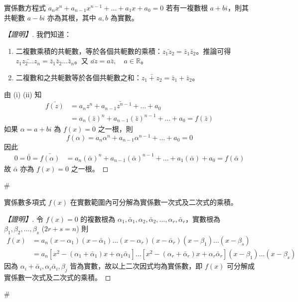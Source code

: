 \begin{theorem}[虛根共軛定理]\label{thm:b6s-2-conjugate}
實係數方程式 $a_n x^n + a_{n-1} x^{n-1} + \dots + a_1 x + a_0 = 0$ 若有一複數根 $a+bi$，則其共軛數 $a-bi$ 亦為其根，其中 $a, b$ 為實數。
\end{theorem}

\begin{proof}[【證明】]
我們知道：
\begin{enumerate}[label=(\roman*), leftmargin=2em]
  \item 二複數乘積的共軛數，等於各個共軛數的乘積：$\bar{z_1 z_2} = \bar{z}_1 \bar{z}_2$。推論可得 $\bar{z_1 z_2 \dots z_n} = \bar{z}_1 \bar{z}_2 \dots \bar{z}_n$。又 $\bar{az} = a\bar{z}, \quad a \in \mathbb{R}$。
  \item 二複數和之共軛數等於各個共軛數之和：$\bar{z_1 + z_2} = \bar{z}_1 + \bar{z}_2$。
\end{enumerate}
由 (i) (ii) 知
\begin{align*}
\bar{f(z)} &= \bar{a_n z^n + a_{n-1} z^{n-1} + \dots + a_0} \\
&= a_n (\bar{z})^n + a_{n-1} (\bar{z})^{n-1} + \dots + a_0 = f(\bar{z})
\end{align*}
如果 $\alpha = a+bi$ 為 $f(x)=0$ 之一根，則
\[ f(\alpha) = a_n \alpha^n + a_{n-1} \alpha^{n-1} + \dots + a_0 = 0 \]
因此
\begin{align*}
0 = \bar{0} = \bar{f(\alpha)} &= a_n (\bar{\alpha})^n + a_{n-1} (\bar{\alpha})^{n-1} + \dots + a_1 (\bar{\alpha}) + a_0 = f(\bar{\alpha})
\end{align*}
故 $\bar{\alpha}$ 亦為 $f(x)=0$ 之一根。
\end{proof}\hfill$\#$

\begin{corollary}\label{cor:b6s-2-real-factor}
實係數多項式 $f(x)$ 在實數範圍內可分解為實係數一次式及二次式的乘積。
\end{corollary}

\begin{proof}[【證明】]
令 $f(x)=0$ 的複數根為 $\alpha_1, \bar{\alpha}_1, \alpha_2, \bar{\alpha}_2, \dots, \alpha_r, \bar{\alpha}_r$，實數根為 $\beta_1, \beta_2, \dots, \beta_s$ ($2r+s=n$) 則
\begin{align*}
f(x) &= a_n (x-\alpha_1)(x-\bar{\alpha}_1)\dots(x-\alpha_r)(x-\bar{\alpha}_r)(x-\beta_1)\dots(x-\beta_s) \\
&= a_n [x^2 - (\alpha_1+\bar{\alpha}_1)x + \alpha_1\bar{\alpha}_1]\dots[x^2 - (\alpha_r+\bar{\alpha}_r)x + \alpha_r\bar{\alpha}_r](x-\beta_1)\dots(x-\beta_s)
\end{align*}
因為 $\alpha_i+\bar{\alpha}_i, \alpha_i\bar{\alpha}_i, \beta_j$ 皆為實數，故以上二次因式均為實係數，即 $f(x)$ 可分解成實係數一次式及二次式的乘積。
\end{proof}\hfill$\#$

